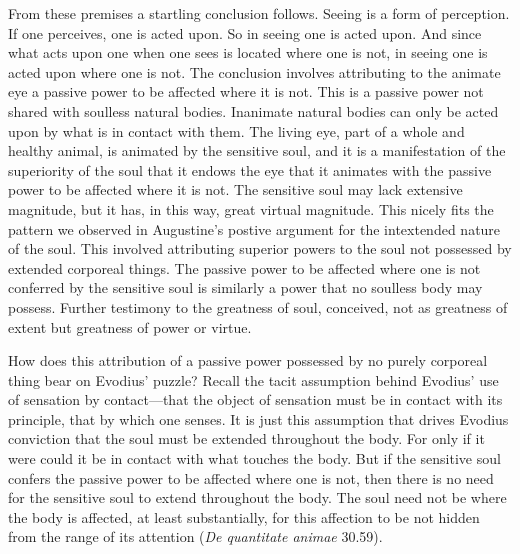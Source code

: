 \documentclass[12pt]{article}
\begin{document}
From these premises a startling conclusion follows. Seeing is a form of perception. If one perceives, one is acted upon. So in seeing one is acted upon. And since what acts upon one when one sees is located where one is not, in seeing one is acted upon where one is not. The conclusion involves attributing to the animate eye a passive power to be affected where it is not. This is a passive power not shared with soulless natural bodies. Inanimate natural bodies can only be acted upon by what is in contact with them. The living eye, part of a whole and healthy animal, is animated by the sensitive soul, and it is a manifestation of the superiority of the soul that it endows the eye that it animates with the passive power to be affected where it is not. The sensitive soul may lack extensive magnitude, but it has, in this way, great virtual magnitude. This nicely fits the pattern we observed in Augustine's postive argument for the intextended nature of the soul. This involved attributing superior powers to the soul not possessed by extended corporeal things. The passive power to be affected where one is not conferred by the sensitive soul is similarly a power that no soulless body may possess. Further testimony to the greatness of soul, conceived, not as greatness of extent but greatness of power or virtue.


How does this attribution of a passive power possessed by no purely corporeal thing bear on Evodius' puzzle? Recall the tacit assumption behind Evodius' use of sensation by contact---that the object of sensation must be in contact with its principle, that by which one senses. It is just this assumption that drives Evodius conviction that the soul must be extended throughout the body. For only if it were could it be in contact with what touches the body. But if the sensitive soul confers the passive power to be affected where one is not, then there is no need for the sensitive soul to extend throughout the body. The soul need not be where the body is affected, at least substantially, for this affection to be not hidden from the range of its attention (\emph{De quantitate animae} 30.59). 
\end{document}
